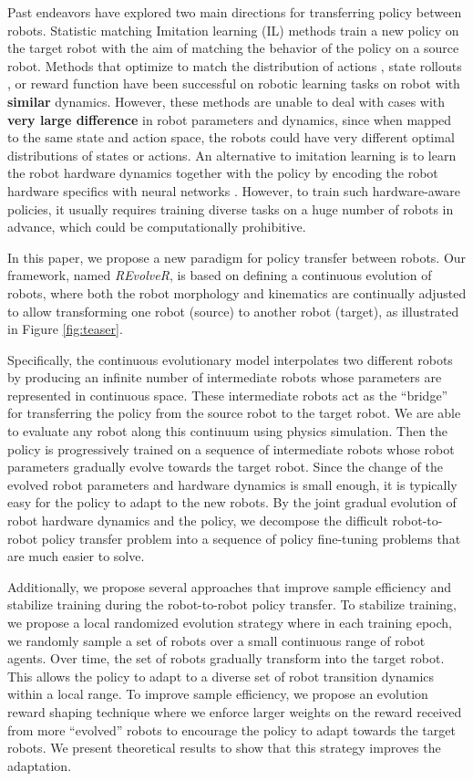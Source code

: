 \documentclass[nohyperref]{article}
\theoremstyle{plain}
\theoremstyle{definition}
\theoremstyle{remark}
\begin{document}
Past endeavors have explored two main directions for transferring policy between robots.
Statistic matching Imitation learning (IL) methods train a new policy on the target robot with the aim of matching the behavior of the policy on a source robot.
Methods that optimize to match the distribution of actions \cite{bc}, state rollouts \cite{sail,soil}, or reward function \cite{irl,gail} have been successful on robotic learning tasks on robot with \textbf{similar} dynamics.
However, these methods are unable to deal with cases with \textbf{very large difference} in robot parameters and dynamics, since when mapped to the same state and action space, the robots could have very different optimal distributions of states or actions.
An alternative to imitation learning is to learn the robot hardware dynamics together with the policy by encoding the robot hardware specifics with neural networks
\cite{chen2018hardware,huang2020one}.
However, to train such hardware-aware policies, it usually requires training diverse tasks on a huge number of robots in advance, which could be computationally prohibitive.

 

In this paper, we propose a new paradigm for policy transfer between robots.
Our framework, named \emph{REvolveR}, is based on defining a continuous evolution of robots, where both the robot morphology and kinematics are continually adjusted to allow transforming one robot (source) to another robot (target), as illustrated in Figure \ref{fig:teaser}.


Specifically, the continuous evolutionary model interpolates two different robots by producing an infinite number of intermediate robots whose parameters are represented in continuous space.
These intermediate robots act as the ``bridge'' for transferring the policy from the source robot to the target robot. 
We are able to evaluate any robot along this continuum using physics simulation.
Then the policy is progressively trained on a sequence of intermediate robots whose robot parameters gradually evolve towards the target robot.
Since the change of the evolved robot parameters and hardware dynamics is small enough, it is typically easy for the policy to adapt to the new robots.
By the joint gradual evolution of robot hardware dynamics and the policy, we decompose the difficult robot-to-robot policy transfer problem into a sequence of policy fine-tuning problems that are much easier to solve.

Additionally, we propose several approaches that improve sample efficiency and stabilize training during the robot-to-robot policy transfer.
To stabilize training, we propose a local randomized evolution strategy where in each training epoch, we randomly sample a set of robots over a small continuous range of robot agents. Over time, the set of robots gradually transform into the target robot.
This allows the policy to adapt to a diverse set of robot transition dynamics within a local range. 
To improve sample efficiency, we propose an evolution reward shaping technique where we enforce larger weights on the reward received from more ``evolved'' robots to encourage the policy to adapt towards the target robots.
We present theoretical results to show that this strategy improves the adaptation.
\end{document}
